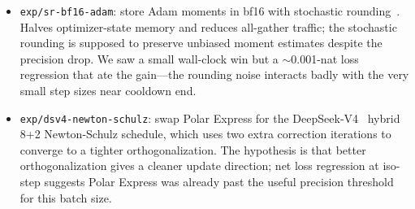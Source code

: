 \documentclass[10pt,letterpaper]{article}
\newcommand{\code}[1]{\texttt{\small #1}}
\begin{document}
\begin{itemize}[leftmargin=1.2em,itemsep=4pt]
  \item \code{exp/sr-bf16-adam}: store Adam moments in bf16 with stochastic rounding~\cite{srbf16}. Halves optimizer-state memory and reduces all-gather traffic; the stochastic rounding is supposed to preserve unbiased moment estimates despite the precision drop. We saw a small wall-clock win but a $\sim$0.001-nat loss regression that ate the gain---the rounding noise interacts badly with the very small step sizes near cooldown end.
  \item \code{exp/dsv4-newton-schulz}: swap Polar Express for the DeepSeek-V4~\cite{deepseek_v4} hybrid 8+2 Newton-Schulz schedule, which uses two extra correction iterations to converge to a tighter orthogonalization. The hypothesis is that better orthogonalization gives a cleaner update direction; net loss regression at iso-step suggests Polar Express was already past the useful precision threshold for this batch size.
\end{itemize}
\end{document}
